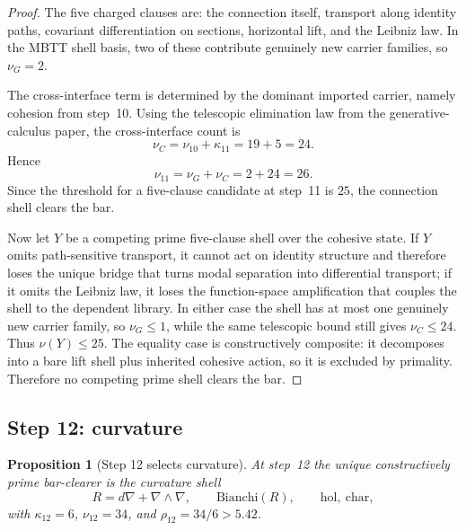 \documentclass[11pt]{article}
\theoremstyle{plain}
\newtheorem{proposition}[theorem]{Proposition}
\theoremstyle{definition}
\theoremstyle{remark}
\newcommand{\hol}{\mathrm{hol}}
\newcommand{\charclass}{\mathrm{char}}
\begin{document}
\begin{proof}
The five charged clauses are: the connection itself, transport along identity paths, covariant differentiation on sections, horizontal lift, and the Leibniz law. In the MBTT shell basis, two of these contribute genuinely new carrier families, so $\nu_G=2$.

The cross-interface term is determined by the dominant imported carrier, namely cohesion from step~10. Using the telescopic elimination law from the generative-calculus paper, the cross-interface count is
\[
  \nu_C = \nu_{10}+\kappa_{11}=19+5=24.
\]
Hence
\[
  \nu_{11}=\nu_G+\nu_C=2+24=26.
\]
Since the threshold for a five-clause candidate at step~11 is $25$, the connection shell clears the bar.

Now let $Y$ be a competing prime five-clause shell over the cohesive state. If $Y$ omits path-sensitive transport, it cannot act on identity structure and therefore loses the unique bridge that turns modal separation into differential transport; if it omits the Leibniz law, it loses the function-space amplification that couples the shell to the dependent library. In either case the shell has at most one genuinely new carrier family, so $\nu_G\le 1$, while the same telescopic bound still gives $\nu_C\le24$. Thus $\nu(Y)\le25$. The equality case is constructively composite: it decomposes into a bare lift shell plus inherited cohesive action, so it is excluded by primality. Therefore no competing prime shell clears the bar.
\end{proof}

\subsection{Step 12: curvature}

\begin{proposition}[Step 12 selects curvature]
\label{prop:step12}
At step~12 the unique constructively prime bar-clearer is the curvature shell
\[
  R=d\nabla+\nabla\wedge\nabla,
  \qquad
  \mathrm{Bianchi}(R),
  \qquad
  \hol,\ \charclass,
\]
with $\kappa_{12}=6$, $\nu_{12}=34$, and $\rho_{12}=34/6>5.42$.
\end{proposition}
\end{document}
